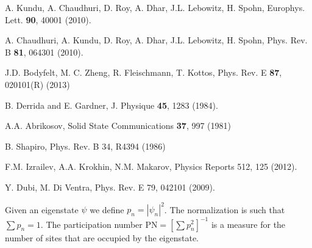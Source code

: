 \documentclass[onecolumn,fleqn,notitlepage,secnumarabic]{revtex4}
\begin{document}
\begin{thebibliography}{99}
A. Kundu, A. Chaudhuri, D. Roy, A. Dhar, J.L. Lebowitz, H. Spohn,
Europhys. Lett. {\bf 90}, 40001 (2010).

A. Chaudhuri, A. Kundu, D. Roy, A. Dhar, J.L. Lebowitz, H. Spohn,
Phys. Rev. B {\bf 81}, 064301 (2010).

J.D. Bodyfelt, M. C. Zheng, R. Fleischmann, T. Kottos, 
Phys. Rev. E {\bf 87}, 020101(R) (2013)

B. Derrida and E. Gardner, 
J. Physique {\bf 45}, 1283 (1984). 

A.A. Abrikosov, 
Solid State Communications {\bf 37}, 997 (1981)

B. Shapiro, 
Phys. Rev. B 34, R4394 (1986)


F.M. Izrailev, A.A. Krokhin, N.M. Makarov,
Physics Reports 512, 125 (2012).

Y. Dubi, M. Di Ventra,
Phys. Rev. E 79, 042101 (2009).

Given an eigenstate $\psi$ we define $p_n=|\psi_n|^2$.
The normalization is such that $\sum p_n=1$. 
The participation number PN$=[\sum p_n^2]^{-1}$ 
is a measure for the number of sites that are occupied 
by the eigenstate.

\end{thebibliography}
\end{document}
